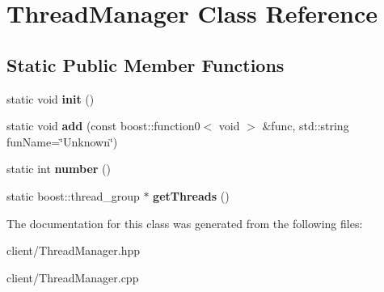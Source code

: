 \hypertarget{class_thread_manager}{\section{Thread\-Manager Class Reference}
\label{class_thread_manager}
}
\subsection*{Static Public Member Functions}
\begin{DoxyCompactItemize}
\item 
\hypertarget{class_thread_manager_a95a2fa9336d2d9a9b2b88fcddc0c3589}{static void {\bfseries init} ()}\label{class_thread_manager_a95a2fa9336d2d9a9b2b88fcddc0c3589}

\item 
\hypertarget{class_thread_manager_a7de67138e6a451a3f17f436505686c65}{static void {\bfseries add} (const boost\-::function0$<$ void $>$ \&func, std\-::string fun\-Name=\char`\"{}Unknown\char`\"{})}\label{class_thread_manager_a7de67138e6a451a3f17f436505686c65}

\item 
\hypertarget{class_thread_manager_ad1e05530c304263b016fe38a4a846453}{static int {\bfseries number} ()}\label{class_thread_manager_ad1e05530c304263b016fe38a4a846453}

\item 
\hypertarget{class_thread_manager_a209bac2744d204535fd488cab0d7cb56}{static boost\-::thread\-\_\-group $\ast$ {\bfseries get\-Threads} ()}\label{class_thread_manager_a209bac2744d204535fd488cab0d7cb56}

\end{DoxyCompactItemize}


The documentation for this class was generated from the following files\-:\begin{DoxyCompactItemize}
\item 
client/Thread\-Manager.\-hpp\item 
client/Thread\-Manager.\-cpp\end{DoxyCompactItemize}
